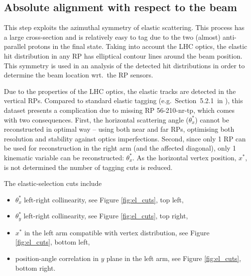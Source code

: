 \documentclass[TOTEM]{cern/cernphprep}
\begin{document}
\subsection{Absolute alignment with respect to the beam}
\label{s:calib-elastic}

This step exploits the azimuthal symmetry of elastic scattering. This process has a large cross-section and is relatively easy to tag due to the two (almost) anti-parallel protons in the final state. Taking into account the LHC optics, the elastic hit distribution in any RP has elliptical contour lines around the beam position. This symmetry is used in an analysis of the detected hit distributions in order to determine the beam location wrt.~the RP sensors.

Due to the properties of the LHC optics, the elastic tracks are detected in the vertical RPs. Compared to standard elastic tagging (e.g.~Section~5.2.1~in \cite{totem-8tev-90m}), this dataset presents a complication due to missing RP 56-210-nr-tp, which comes with two consequences. First, the horizontal scattering angle ($\theta_x^*$) cannot be reconstructed in optimal way -- using both near and far RPs, optimising both resolution and stability against optics imperfections. Second, since only 1 RP can be used for reconstruction in the right arm (and the affected diagonal), only 1 kinematic variable can be reconstructed: $\theta_x^*$. As the horizontal vertex position, $x^*$, is not determined the number of tagging cuts is reduced.

The elastic-selection cuts include
\begin{itemize}[nosep]
\item $\theta_x^*$ left-right collinearity, see Figure \ref{fig:el_cuts}, top left,
\item $\theta_y^*$ left-right collinearity, see Figure \ref{fig:el_cuts}, top right,
\item $x^*$ in the left arm compatible with vertex distribution, see Figure \ref{fig:el_cuts}, bottom left,
\item position-angle correlation in $y$ plane in the left arm, see Figure \ref{fig:el_cuts}, bottom right.
\end{itemize}
\end{document}
